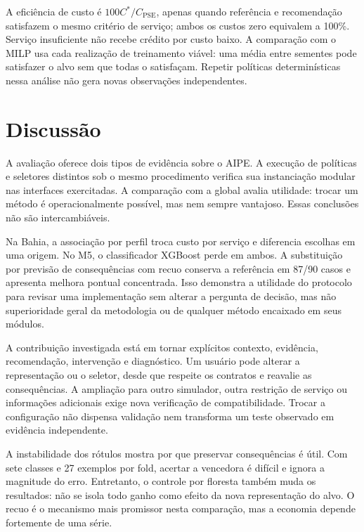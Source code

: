 \documentclass[preprint,12pt]{elsarticle}
\begin{document}
A eficiência de custo é $100C^*/C_{\mathrm{PSE}}$, apenas quando referência e recomendação satisfazem o mesmo critério de serviço; ambos os custos zero equivalem a 100\%. Serviço insuficiente não recebe crédito por custo baixo. A comparação com o MILP usa cada realização de treinamento viável: uma média entre sementes pode satisfazer o alvo sem que todas o satisfaçam. Repetir políticas determinísticas nessa análise não gera novas observações independentes.





\section{Discussão}
A avaliação oferece dois tipos de evidência sobre o AIPE. A execução de políticas e seletores distintos sob o mesmo procedimento verifica sua instanciação modular nas interfaces exercitadas. A comparação com a global avalia utilidade: trocar um método é operacionalmente possível, mas nem sempre vantajoso. Essas conclusões não são intercambiáveis.

Na Bahia, a associação por perfil troca custo por serviço e diferencia escolhas em uma origem. No M5, o classificador XGBoost perde em ambos. A substituição por previsão de consequências com recuo conserva a referência em 87/90 casos e apresenta melhora pontual concentrada. Isso demonstra a utilidade do protocolo para revisar uma implementação sem alterar a pergunta de decisão, mas não superioridade geral da metodologia ou de qualquer método encaixado em seus módulos.

A contribuição investigada está em tornar explícitos contexto, evidência, recomendação, intervenção e diagnóstico. Um usuário pode alterar a representação ou o seletor, desde que respeite os contratos e reavalie as consequências. A ampliação para outro simulador, outra restrição de serviço ou informações adicionais exige nova verificação de compatibilidade. Trocar a configuração não dispensa validação nem transforma um teste observado em evidência independente.

A instabilidade dos rótulos mostra por que preservar consequências é útil. Com sete classes e 27 exemplos por fold, acertar a vencedora é difícil e ignora a magnitude do erro. Entretanto, o controle por floresta também muda os resultados: não se isola todo ganho como efeito da nova representação do alvo. O recuo é o mecanismo mais promissor nesta comparação, mas a economia depende fortemente de uma série.
\end{document}
